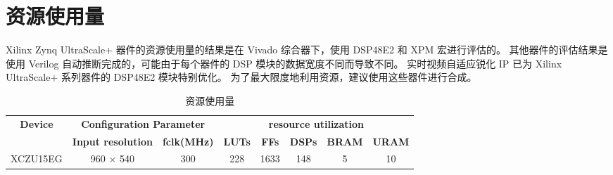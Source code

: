 \documentclass[12pt, a4paper, oneside]{ctexbook}
\begin{document}
	\section{资源使用量}	
	Xilinx Zynq UltraScale+ 器件的资源使用量的结果是在 Vivado 综合器下，使用 DSP48E2 和 XPM 宏进行评估的。
	其他器件的评估结果是使用 Verilog 自动推断完成的，可能由于每个器件的 DSP 模块的数据宽度不同而导致不同。
	实时视频自适应锐化 IP 已为 Xilinx UltraScale+ 系列器件的 DSP48E2 模块特别优化。
	为了最大限度地利用资源，建议使用这些器件进行合成。
	\begin{table}[h]
		\centering
		\begin{tabular}{|c|cc|ccccc|}
			\hline
			\multirow{2}{*}{\textbf{Device}} & \multicolumn{2}{c|}{\textbf{Configuration Parameter}}               & \multicolumn{5}{c|}{\textbf{resource utilization}}                                                                                                               \\ \cline{2-8} 
			& \multicolumn{1}{c|}{\textbf{Input resolution}} & \textbf{fclk(MHz)} & \multicolumn{1}{c|}{\textbf{LUTs}} & \multicolumn{1}{c|}{\textbf{FFs}} & \multicolumn{1}{c|}{\textbf{DSPs}} & \multicolumn{1}{c|}{\textbf{BRAM}} & \textbf{URAM} \\ \hline
			XCZU15EG                         & \multicolumn{1}{c|}{960 × 540}                 & 300                & \multicolumn{1}{c|}{228}           & \multicolumn{1}{c|}{1633}         & \multicolumn{1}{c|}{148}           & \multicolumn{1}{c|}{5}             & 10            \\ \hline
		\end{tabular}
	\caption{资源使用量}
	\end{table}
	
\end{document}
